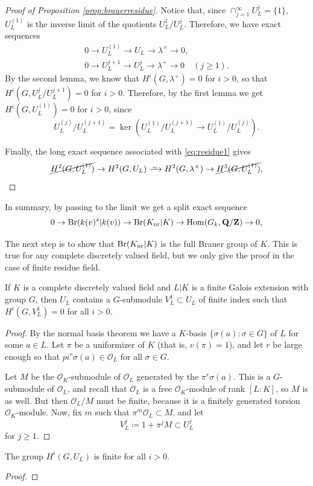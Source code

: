 \documentclass{article}
\begin{document}
\begin{proof}[Proof of Proposition \ref{prop:brauerresidue}]
		Notice that, since $\cap_{j=1}^\infty U_L^j = \{1\}$, $U_L^{(1)}$ is the inverse limit of the quotients $U_L^1/U_L^j$. Therefore, we have exact sequences
		\begin{gather}
				0 \to U_L^{(1)} \to U_L \to \lambda^\times \to 0,\label{eq:residue1} \\
				0 \to U_L^{j+1} \to U_L^j \to \lambda^+ \to 0 \quad (j\ge 1).
		\end{gather}
		By the second lemma, we know that $H^i(G,\lambda^+)=0$ for $i>0$, so that $H^i(G,U_L^j /U_L^{j+1})=0$ for $i>0$. Therefore, by the first lemma we get $H^i(G,U_L^{(1)})=0$ for $i>0$, since $$U_L^{(j)}/U_L^{(j+1)}=\ker (U_L^{(1)}/U_L^{(j+1)}\to U_L^{(1)}/U_L^{(j)}).$$
		
		Finally, the long exact sequence associated with \eqref{eq:residue1} gives
		\[
			\cancel{H^2(G,U_L^{(1)})} \to H^2(G,U_L) \Iso H^2(G,\lambda^\times) \to \cancel{H^3(G,U_L^{(1)})},
			\]
\end{proof}
In summary, by passing to the limit we get a split exact sequence 
\[
	0\to \text{Br}(k(v)^s|k(v))\to \text{Br}(K_\text{nr}|K)\to \operatorname{Hom}(G_k,\mathbf{Q}/\mathbf{Z})\to 0,
\]

The next step is to show that $\text{Br}(K_\text{nr}|K)$ is the full Brauer group of $K$. This is true for any complete discretely valued field, but we only give the proof in the case of finite residue field.

\begin{lem}\label{lem:trivsubmod}
		If $K$ is a complete discretely valued field and $L|K$ is a finite Galois extension with group $G$, then $U_L$ contains a $G$-submodule $V_L^1\subset U_L$ of finite index such that $H^i(G,V_L^1)=0$ for all $i>0$.
\end{lem}
\begin{proof}
		By the normal basis theorem we have a $K$-basis $\{\sigma(a):\sigma\in G\}$ of $L$ for some $a\in L$. Let $\pi$ be a uniformizer of $K$ (that is, $v(\pi)=1$), and let $r$ be large enough so that $pi^r \sigma(a)\in \mathcal{O}_L$ for all $\sigma\in G$.
		
		Let $M$ be the $\mathcal{O}_K$-submodule of $\mathcal{O}_L$ generated by the $\pi^r\sigma(a)$. This is a $G$-submodule of $\mathcal{O}_L$, and recall that $\mathcal{O}_L$ is a free $\mathcal{O}_K$-module of rank $[L:K]$, so $M$ is as well. But then $\mathcal{O}_L/M$ must be finite, because it is a finitely generated torsion $\mathcal{O}_K$-module. Now, fix $m$ such that $\pi^m \mathcal{O}_L\subset M$, and let 
\[V_L^j\coloneqq 1 + \pi^j M \subset U_L^j\] for $j\ge 1$. 
\end{proof}
\begin{cor}
		The group $H^i(G,U_L)$ is finite for all $i>0$.
\end{cor}
\begin{proof}
\end{proof}
\end{document}
